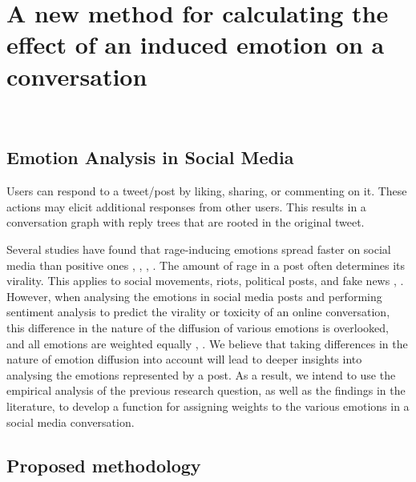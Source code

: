 \section{A new method for calculating the effect of an induced emotion on a conversation}~\label{sec:approach}
\subsection{Emotion Analysis in Social Media}
Users can respond to a tweet/post by liking, sharing, or commenting on it. These actions may elicit additional responses from other users. This results in a conversation graph with reply trees that are rooted in the original tweet.


Several studies have found that rage-inducing emotions spread faster on social media than positive ones \cite{bacaksizlar2019understanding}, \cite{steinert2022emotions}, \cite{chuai2020anger}, \cite{yi2022depicting}. The amount of rage in a post often determines its virality. This applies to social movements, riots, political posts, and fake news \cite{solovev2022moral}, \cite{mirbabaie2021development}. However, when analysing the emotions in social media posts and performing sentiment analysis to predict the virality or toxicity of an online conversation, this difference in the nature of the diffusion of various emotions is overlooked, and all emotions are weighted equally \cite{yue2019survey}, \cite{nemes2021social}. We believe that taking differences in the nature of emotion diffusion into account will lead to deeper insights into analysing the emotions represented by a post. As a result, we intend to use the empirical analysis of the previous research question, as well as the findings in the literature, to develop a function for assigning weights to the various emotions in a social media conversation.
\subsection{Proposed methodology}
